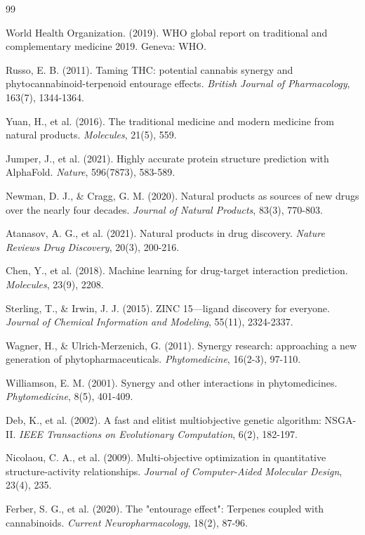\documentclass[11pt,a4paper]{article}
\begin{document}
\begin{thebibliography}{99}

 World Health Organization. (2019). WHO global report on traditional and complementary medicine 2019. Geneva: WHO.

 Russo, E. B. (2011). Taming THC: potential cannabis synergy and phytocannabinoid-terpenoid entourage effects. \textit{British Journal of Pharmacology}, 163(7), 1344-1364.

 Yuan, H., et al. (2016). The traditional medicine and modern medicine from natural products. \textit{Molecules}, 21(5), 559.

 Jumper, J., et al. (2021). Highly accurate protein structure prediction with AlphaFold. \textit{Nature}, 596(7873), 583-589.

 Newman, D. J., \& Cragg, G. M. (2020). Natural products as sources of new drugs over the nearly four decades. \textit{Journal of Natural Products}, 83(3), 770-803.

 Atanasov, A. G., et al. (2021). Natural products in drug discovery. \textit{Nature Reviews Drug Discovery}, 20(3), 200-216.

 Chen, Y., et al. (2018). Machine learning for drug-target interaction prediction. \textit{Molecules}, 23(9), 2208.

 Sterling, T., \& Irwin, J. J. (2015). ZINC 15—ligand discovery for everyone. \textit{Journal of Chemical Information and Modeling}, 55(11), 2324-2337.

 Wagner, H., \& Ulrich-Merzenich, G. (2011). Synergy research: approaching a new generation of phytopharmaceuticals. \textit{Phytomedicine}, 16(2-3), 97-110.

 Williamson, E. M. (2001). Synergy and other interactions in phytomedicines. \textit{Phytomedicine}, 8(5), 401-409.

 Deb, K., et al. (2002). A fast and elitist multiobjective genetic algorithm: NSGA-II. \textit{IEEE Transactions on Evolutionary Computation}, 6(2), 182-197.

 Nicolaou, C. A., et al. (2009). Multi-objective optimization in quantitative structure-activity relationships. \textit{Journal of Computer-Aided Molecular Design}, 23(4), 235.

 Ferber, S. G., et al. (2020). The "entourage effect": Terpenes coupled with cannabinoids. \textit{Current Neuropharmacology}, 18(2), 87-96.


\end{thebibliography}
\end{document}
